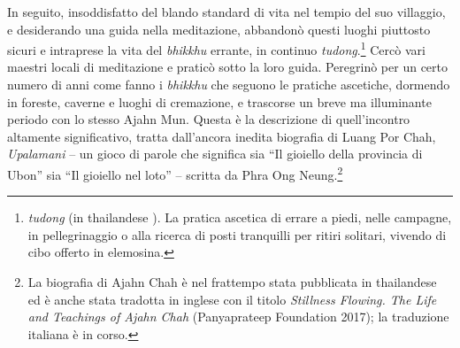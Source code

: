 In seguito, insoddisfatto del blando standard di vita nel tempio del suo
villaggio, e desiderando una guida nella meditazione, abbandonò questi
luoghi piuttosto sicuri e intraprese la vita del \emph{bhikkhu} errante,
in continuo \emph{tudong}.\footnote{\emph{tudong} (in thailandese
  ). La pratica ascetica di errare a piedi, nelle campagne, in
  pellegrinaggio o alla ricerca di posti tranquilli per ritiri solitari,
  vivendo di cibo offerto in elemosina.} Cercò vari maestri locali di
meditazione e praticò sotto la loro guida. Peregrinò per un certo numero
di anni come fanno i \emph{bhikkhu} che seguono le pratiche ascetiche,
dormendo in foreste, caverne e luoghi di cremazione, e trascorse un
breve ma illuminante periodo con lo stesso Ajahn Mun. Questa è la
descrizione di quell'incontro altamente significativo, tratta
dall'ancora inedita biografia di Luang Por Chah, \emph{Upalamani} -- un
gioco di parole che significa sia ``Il gioiello della provincia di
Ubon'' sia ``Il gioiello nel loto'' -- scritta da Phra Ong
Neung.\footnote{La biografia di Ajahn Chah è nel frattempo stata
  pubblicata in thailandese ed è anche stata tradotta in inglese con il
  titolo \emph{Stillness Flowing. The Life and Teachings of Ajahn Chah}
  (Panyaprateep Foundation 2017); la traduzione italiana è in corso.}


